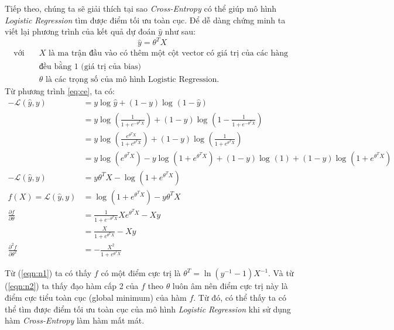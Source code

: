 Tiếp theo, chúng ta sẽ giải thích tại sao \textit{Cross-Entropy} có thể giúp mô hình \textit{Logistic Regression} tìm được điểm tối ưu toàn cục. Để dễ dàng chứng minh ta viết lại phương trình của kết quả dự đoán $\hat{y}$ như sau:
\begin{equation*}
    \hat{y} = \theta^TX
\end{equation*}
\begin{align*}
  \text{với} \quad &X \text{ là ma trận đầu vào có thêm một cột vector có giá trị của các hàng }\\
  & \text{đều bằng 1 (giá trị của bias)}\\
     &\theta \text{ là các trọng số của mô hình Logistic Regression.}
\end{align*}
Từ phương trình \eqref{eq:ce}, ta có:
\begin{align}
-\mathcal{L}(\hat{y}, y) & = y\log_{}{\hat{y}} + (1 - y)\log_{}{(1 - \hat{y})} \nonumber\\
              & = y\log_{}{(\frac{1}{1 + e^{-\theta^TX}})} + (1 - y)\log_{}{(1 - \frac{1}{1 + e^{-\theta^TX}})} \nonumber\\
              & = y\log_{}{(\frac{e^{\theta^TX}}{1 + e^{\theta^TX}})} + (1 - y)\log_{}{(\frac{1}{1 + e^{\theta^TX}})} \nonumber\\
              & = y\log_{}{(e^{\theta^TX})} - y\log_{}{(1+ e^{\theta^TX})} + (1 - y)\log_{}{(1)} + (1 - y)\log_{}{(1 + e^{\theta^TX})} \nonumber\\
-\mathcal{L}(\hat{y}, y) & = y\theta^TX - \log_{}{(1 + e^{\theta^TX})} \nonumber\\
f(X) = \mathcal{L}(\hat{y}, y) & = \log_{}{(1 + e^{\theta^TX})} - y\theta^TX \nonumber\\
\frac{\partial f}{\partial \theta} & = \frac{1}{1 + e^{-\theta^TX}}Xe^{\theta^TX} - Xy \nonumber\\
\label{eqn:n1} & = \frac{X}{1 + e^{\theta^TX}} - Xy  \\ 
\label{eqn:n2} \frac{\partial^2 f}{\partial \theta^2} & = -\frac{X^2}{1 + e^{\theta^TX}} 
\end{align}

Từ (\ref{eqn:n1}) ta có thấy $f$ có một điểm cực trị là $\theta^T = \ln{(y^{-1} - 1)}X^{-1}$. Và từ (\ref{eqn:n2}) ta thấy đạo hàm cấp 2 của $f$ theo $\theta$ luôn âm nên điểm cực trị này là điểm cực tiểu toàn cục (global minimum) của hàm $f$. Từ đó, có thể thấy ta có thể tìm được điểm tối ưu toàn cục của mô hình \textit{Logistic Regression} khi sử dụng hàm \textit{Cross-Entropy} làm hàm mất mát.

